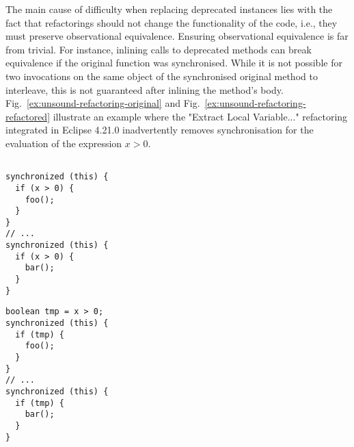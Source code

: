 \documentclass[sigconf,review,anonymous]{acmart}
\begin{document}
The main cause of difficulty when replacing deprecated instances lies
with the fact that refactorings should not change the functionality of
the code, i.e., they must preserve observational equivalence.
Ensuring observational equivalence is far from trivial.  For instance,
inlining calls to deprecated methods can break equivalence if the
original function was synchronised.  While it is not possible for two
invocations  on the same object of the synchronised original method to
interleave, this is not guaranteed after inlining the method's body.
Fig.~\ref{ex:unsound-refactoring-original} and
Fig.~\ref{ex:unsound-refactoring-refactored} illustrate an example where
the "Extract Local Variable..." refactoring integrated in Eclipse 4.21.0
inadvertently removes synchronisation for the evaluation of the expression
$x > 0$.

\begin{minipage}{.23\textwidth}
\begin{lstlisting}[mathescape=true,showstringspaces=false]

synchronized (this) {
  if (x > 0) {
    foo();
  }
}
// ...
synchronized (this) {
  if (x > 0) {
    bar();
  }
}
\end{lstlisting}
\label{ex:unsound-refactoring-original}
\end{minipage}
\begin{minipage}{.23\textwidth}
\begin{lstlisting}[mathescape=true,showstringspaces=false]
boolean tmp = x > 0;
synchronized (this) {
  if (tmp) {
    foo();
  }
}
// ...
synchronized (this) {
  if (tmp) {
    bar();
  }
}
\end{lstlisting}
\label{ex:unsound-refactoring-refactored}
\end{minipage}
\vspace{0.8em}

\end{document}
